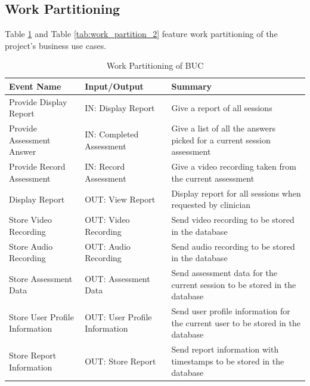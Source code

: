 \documentclass[12pt]{article}
\begin{document}
\subsection{Work Partitioning}
\hspace{2em}Table \ref{tab:work_partition_1} and Table \ref{tab:work_partition_2} feature work partitioning of the project's business use cases.
\begin{table}[H]
  \centering
  \caption{Work Partitioning of BUC}
  \label{tab:work_partition_1}
  \begin{tabularx}{1.2\textwidth} { 
     | >{\raggedright\arraybackslash}X 
     | >{\raggedright\arraybackslash}X 
     | >{\raggedright\arraybackslash}X | }
  \hline
  \textbf{Event Name} & \textbf{Input/Output} & \textbf{Summary} \\
  \hline
  Provide Display Report & IN: Display Report & Give a report of all sessions\\ 
  \hline
  Provide Assessment Answer & IN: Completed Assessment & Give a list of all the answers picked for a current session assessment \\ 
  \hline
  Provide Record Assessment & IN: Record Assessment & Give a video recording taken from the current assessment \\ 
  \hline
  Display Report & OUT: View Report  & Display report for all sessions when requested by clinician   \\ 
  \hline
  Store Video Recording & OUT: Video Recording  & Send video recording to be stored in the database \\
  \hline
  Store Audio Recording & OUT: Audio Recording  & Send audio recording to be stored in the database \\
  \hline
  Store Assessment Data & OUT: Assessment Data  & Send assessment data for the current session to be stored in the database \\
  \hline
  Store User Profile Information & OUT: User Profile Information  & Send user profile information for the current user to be stored in the database \\
  \hline
  Store Report Information & OUT: Store Report  & Send report information with timestamps to be stored in the database \\
  \hline
  \end{tabularx}
\end{table}

\newpage
\end{document}

